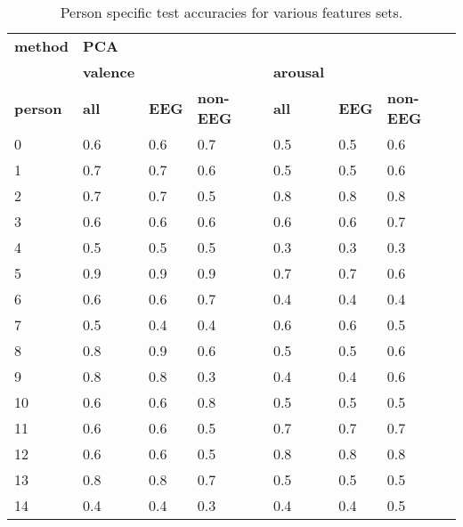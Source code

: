 \begin{table}[]
\centering
\caption{Person specific test accuracies for various features sets.}
\begin{tabular}{l|lll|lll}
\textbf{method}          & \textbf{PCA}                  &           &         &         &     &         \\
                & \textbf{valence}              &           &         & \textbf{arousal} &     &         \\
\textbf{person}          & \textbf{all}                  & \textbf{EEG}       & \textbf{non-EEG} & \textbf{all}     & \textbf{EEG} & \textbf{non-EEG} \\ \hline 
 0               & 0.6                  & 0.6       & 0.7     & 0.5     & 0.5 & 0.6     \\
1               & 0.7                  & 0.7       & 0.6     & 0.5     & 0.5 & 0.6     \\
2               & 0.7                  & 0.7       & 0.5     & 0.8     & 0.8 & 0.8     \\
3               & 0.6                  & 0.6       & 0.6     & 0.6     & 0.6 & 0.7     \\
4               & 0.5                  & 0.5       & 0.5     & 0.3     & 0.3 & 0.3     \\
5               & 0.9                  & 0.9       & 0.9     & 0.7     & 0.7 & 0.6     \\
6               & 0.6                  & 0.6       & 0.7     & 0.4     & 0.4 & 0.4     \\
7               & 0.5                  & 0.4       & 0.4     & 0.6     & 0.6 & 0.5     \\
8               & 0.8                  & 0.9       & 0.6     & 0.5     & 0.5 & 0.6     \\
9               & 0.8                  & 0.8       & 0.3     & 0.4     & 0.4 & 0.6     \\
10              & 0.6                  & 0.6       & 0.8     & 0.5     & 0.5 & 0.5     \\
11              & 0.6                  & 0.6       & 0.5     & 0.7     & 0.7 & 0.7     \\
12              & 0.6                  & 0.6       & 0.5     & 0.8     & 0.8 & 0.8     \\
13              & 0.8                  & 0.8       & 0.7     & 0.5     & 0.5 & 0.5     \\
14              & 0.4                  & 0.4       & 0.3     & 0.4     & 0.4 & 0.5     \\

\end{tabular}
\end{table}
